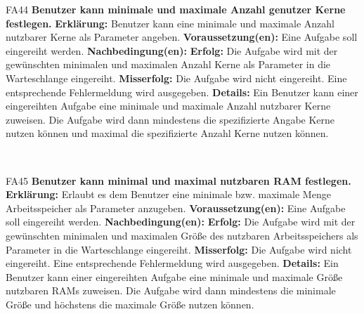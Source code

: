 \documentclass[a4paper,12pt]{article}
\begin{document}
\begin{itemize}[nosep]
	\begin{minipage}[t]{\linewidth}
		\item[FA44] \textbf{Benutzer kann minimale und maximale Anzahl genutzer Kerne festlegen.}
		\subitem \textbf{Erklärung:} \gls{Benutzer} kann eine minimale und maximale Anzahl nutzbarer Kerne als Parameter angeben.
		\subitem \textbf{Voraussetzung(en):} Eine Aufgabe soll eingereiht werden.
		\subitem \textbf{Nachbedingung(en):}
		\subsubitem \textbf{Erfolg:} Die Aufgabe wird mit der gewünschten minimalen und maximalen Anzahl Kerne als Parameter in die Warteschlange eingereiht.
		\subsubitem \textbf{Misserfolg:} Die Aufgabe wird nicht eingereiht. Eine entsprechende Fehlermeldung wird ausgegeben.
		\subitem \textbf{Details:} Ein \gls{Benutzer} kann einer eingereihten Aufgabe eine minimale und maximale Anzahl nutzbarer Kerne zuweisen. Die Aufgabe wird dann mindestens die spezifizierte Angabe Kerne nutzen können und maximal die spezifizierte Anzahl Kerne nutzen können.
	\end{minipage}
	\newline
	\\
	
	\begin{minipage}[t]{\linewidth}
		\item[FA45] \textbf{Benutzer kann minimal und maximal nutzbaren RAM festlegen.}
		\subitem \textbf{Erklärung:} Erlaubt es dem \gls{Benutzer} eine minimale bzw. maximale Menge Arbeitsspeicher als Parameter anzugeben.
		\subitem \textbf{Voraussetzung(en):} Eine Aufgabe soll eingereiht werden.
		\subitem \textbf{Nachbedingung(en):}
		\subsubitem \textbf{Erfolg:} Die Aufgabe wird mit der gewünschten minimalen und maximalen Größe des nutzbaren Arbeitsspeichers als Parameter in die Warteschlange eingereiht.
		\subsubitem \textbf{Misserfolg:} Die Aufgabe wird nicht eingereiht. Eine entsprechende Fehlermeldung wird ausgegeben.
		\subitem \textbf{Details:} Ein \gls{Benutzer} kann einer eingereihten Aufgabe eine minimale und maximale Größe nutzbaren RAMs zuweisen. Die Aufgabe wird dann mindestens die minimale Größe und höchstens die maximale Größe nutzen können.
	\end{minipage}
	\newline
	\\
	

\end{itemize}
\end{document}
